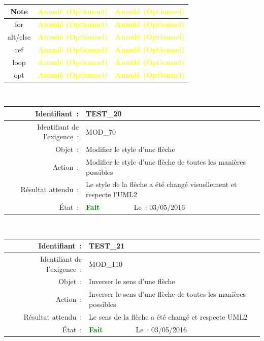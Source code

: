 \documentclass[hidelinks, a4paper,11pt,twoside,final]{article}
\begin{document}
\begin{tabular}{|c|c|c|}
    {Note} & {\textcolor{yellow}{\textbf{Annulé (Optionnel)}}} & {\textcolor{yellow}{\textbf{Annulé (Optionnel)}}} \\\hline
    {for} & {\textcolor{yellow}{\textbf{Annulé (Optionnel)}}} & {\textcolor{yellow}{\textbf{Annulé (Optionnel)}}} \\\hline
    {alt/else} & {\textcolor{yellow}{\textbf{Annulé (Optionnel)}}} & {\textcolor{yellow}{\textbf{Annulé (Optionnel)}}} \\\hline
    {ref} & {\textcolor{yellow}{\textbf{Annulé (Optionnel)}}} & {\textcolor{yellow}{\textbf{Annulé (Optionnel)}}} \\\hline
    {loop} & {\textcolor{yellow}{\textbf{Annulé (Optionnel)}}} & {\textcolor{yellow}{\textbf{Annulé (Optionnel)}}} \\\hline
    {opt} & {\textcolor{yellow}{\textbf{Annulé (Optionnel)}}} & {\textcolor{yellow}{\textbf{Annulé (Optionnel)}}} \\\hline
    \end{tabular}
    \\
    \newline

     \begin{tabular}{|r|p{5cm}|p{5cm}|}\hline
    {Identifiant~:} & \multicolumn{2}{|p{10cm}|}{TEST\_20} \\\hline
    {Identifiant de l’exigence~:} & \multicolumn{2}{|p{10cm}|}{MOD\_70} \\\hline
        {Objet~:} & \multicolumn{2}{|p{10cm}|}{Modifier le style d’une flèche} \\\hline
        {Action~:} & \multicolumn{2}{|p{10cm}|}{Modifier le style d’une flèche de toutes les manières possibles} \\\hline
        {Résultat attendu~:} & \multicolumn{2}{|p{10cm}|}{Le style de la flèche a été changé visuellement et respecte l’UML2} \\\hline
        {État~:} & {\textcolor{green}{\textbf{Fait}}} & {Le~: 03/05/2016 } \\\hline
    \end{tabular}
    \\
    \newline

    \begin{tabular}{|r|p{5cm}|p{5cm}|}\hline
    {Identifiant~:} & \multicolumn{2}{|p{10cm}|}{TEST\_21} \\\hline
    {Identifiant de l’exigence~:} & \multicolumn{2}{|p{10cm}|}{MOD\_110} \\\hline
        {Objet~:} & \multicolumn{2}{|p{10cm}|}{Inverser le sens d’une flèche} \\\hline
        {Action~:} & \multicolumn{2}{|p{10cm}|}{Inverser le sens d’une flèche de toutes les manières possibles} \\\hline
        {Résultat attendu~:} & \multicolumn{2}{|p{10cm}|}{Le sens de la flèche a été changé et respecte UML2} \\\hline
        {État~:} & {\textcolor{green}{\textbf{Fait}}} & {Le~: 03/05/2016 } \\\hline
    \end{tabular}
    \\
    \newline
\end{document}
